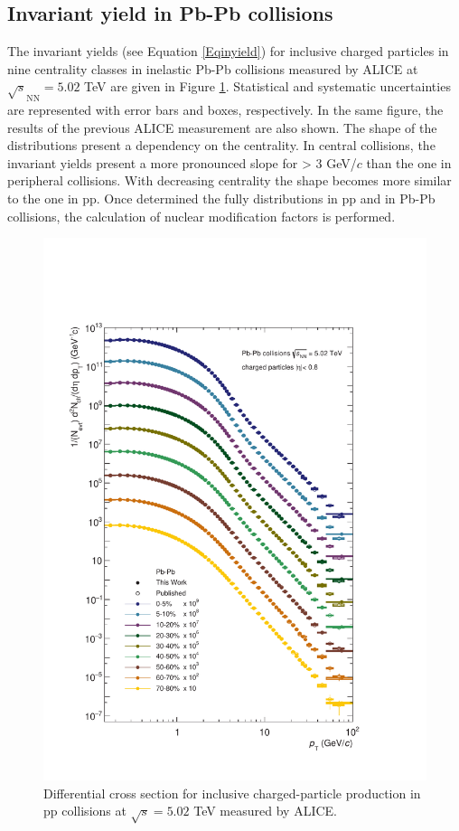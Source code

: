 \documentclass[12pt,a4paper]{report}
\begin{document}
\subsection{Invariant yield in Pb-Pb collisions}
The invariant yields (see Equation \ref{Eqinyield}) for inclusive charged particles in nine centrality classes in inelastic Pb-Pb collisions measured by ALICE at $\sqrt{s}_\text{NN}=5.02$ TeV are given in Figure \ref{invYield}. Statistical and systematic uncertainties are represented with error bars and boxes, respectively. In the same figure, the results of the previous ALICE measurement are also shown. The shape of the \pt distributions present a dependency on the centrality. In central collisions, the invariant yields present a more pronounced slope for \pt > 3 GeV/$c$ than the one in peripheral collisions. With decreasing centrality the shape becomes more similar to the one in pp. Once determined the fully \pt distributions in pp and in Pb-Pb collisions, the calculation of nuclear modification factors is performed.
\begin{figure}[tb!]
\centering
\includegraphics[width=12cm]{Plots/invYieldPbPb.pdf}  
\caption{Differential cross section for inclusive charged-particle production in pp collisions at $\sqrt{s}=5.02$ TeV measured by ALICE.}
\label{invYield}
\end{figure}
\end{document}
